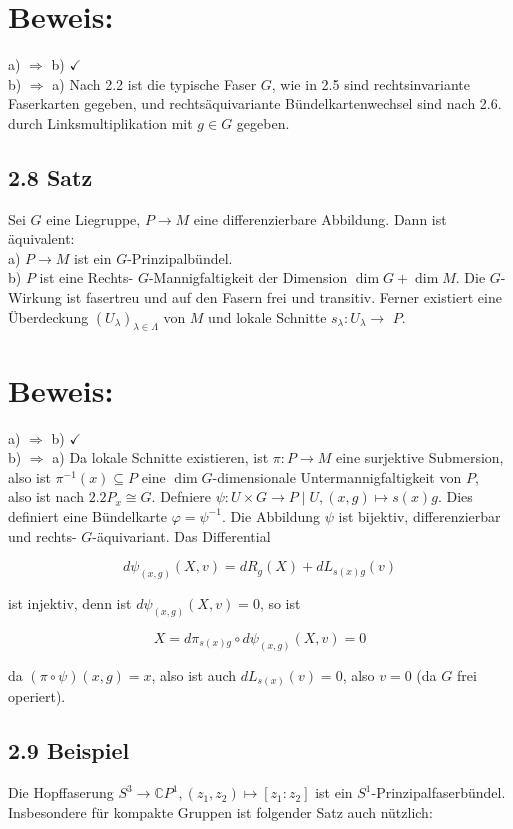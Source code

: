 \documentclass[10pt, letterpaper]{article}
\begin{document}
\section*{Beweis:}
a) $\Rightarrow$ b) $\checkmark$\\
b) $\Rightarrow$ a) Nach 2.2 ist die typische Faser $G$, wie in 2.5 sind rechtsinvariante Faserkarten gegeben, und rechtsäquivariante Bündelkartenwechsel sind nach 2.6. durch Linksmultiplikation mit $g \in G$ gegeben.

\subsection*{2.8 Satz}
Sei $G$ eine Liegruppe, $P \rightarrow M$ eine differenzierbare Abbildung. Dann ist äquivalent:\\
a) $P \rightarrow M$ ist ein $G$-Prinzipalbündel.\\
b) $P$ ist eine Rechts- $G$-Mannigfaltigkeit der Dimension $\operatorname{dim} G+\operatorname{dim} M$. Die $G$-Wirkung ist fasertreu und auf den Fasern frei und transitiv. Ferner existiert eine Überdeckung $\left(U_{\lambda}\right)_{\lambda \in \Lambda}$ von $M$ und lokale Schnitte $s_{\lambda}: U_{\lambda} \rightarrow$ $P$.

\section*{Beweis:}
a) $\Rightarrow$ b) $\checkmark$\\
b) $\Rightarrow$ a) Da lokale Schnitte existieren, ist $\pi: P \rightarrow M$ eine surjektive Submersion, also ist $\pi^{-1}(x) \subseteq P$ eine $\operatorname{dim} G$-dimensionale Untermannigfaltigkeit von $P$,\\
also ist nach $2.2 P_{x} \cong G$. Defniere $\psi: U \times G \rightarrow P \mid U,(x, g) \mapsto s(x) g$. Dies definiert eine Bündelkarte $\varphi=\psi^{-1}$. Die Abbildung $\psi$ ist bijektiv, differenzierbar und rechts- $G$-äquivariant. Das Differential

$$
d \psi_{(x, g)}(X, v)=d R_{g}(X)+d L_{s(x) g}(v)
$$

ist injektiv, denn ist $d \psi_{(x, g)}(X, v)=0$, so ist

$$
X=d \pi_{s(x) g} \circ d \psi_{(x, g)}(X, v)=0
$$

da $(\pi \circ \psi)(x, g)=x$, also ist auch $d L_{s(x)}(v)=0$, also $v=0$ (da $G$ frei operiert).

\subsection*{2.9 Beispiel}
Die Hopffaserung $S^{3} \rightarrow \mathbb{C} P^{1},\left(z_{1}, z_{2}\right) \mapsto\left[z_{1}: z_{2}\right]$ ist ein $S^{1}$-Prinzipalfaserbündel.\\
Insbesondere für kompakte Gruppen ist folgender Satz auch nützlich:
\end{document}
